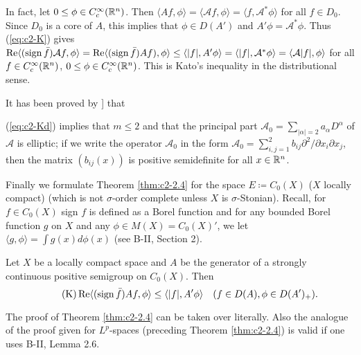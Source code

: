 In fact, let $0 \leq \phi \in C_{c}^{\infty}(\mathbb{R}^n)$.
Then $\langle Af,\phi \rangle = \langle \mathcal{A}f,\phi \rangle = \langle f,\mathcal{A}^{*}\phi \rangle$ for all $f \in D_{0}$.
Since $D_{0}$ is a core of $A$, this implies that $\phi \in D(A')$ and $A'\phi = \mathcal{A}^{*}\phi$.
Thus (\ref{eq:c2-K})   gives $\mathop{}\!\mathrm{Re}\langle(\operatorname{sign} \bar{f})\mathcal{A}f,\phi \rangle = \mathop{}\!\mathrm{Re}\langle(\operatorname{sign} \bar{f})Af),\phi \rangle \leq \langle |f|,A'\phi \rangle = \langle |f|,\mathcal{A}^{*}\phi \rangle = \langle \mathcal{A}|f|,\phi \rangle$ for all $f \in C_{c}^{\infty}(\mathbb{R}^n)$, $0 \leq \phi \in C_{c}^{\infty}(\mathbb{R}^n)$.
This is Kato's inequality in the distributional sense.

\begin{remark*}\label{rem:c2-3.0}
%
%
%
It has been proved by \citet{miyajimaokazawa:1984}] that 

 (\ref{eq:c2-Kd}) implies that $m \leq 2$ and that the principal part $\mathcal{A}_{0} = \sum_{|\alpha|=2} a_{\alpha} D^{\alpha}$ of $\mathcal{A}$ is elliptic; \ie if we write the operator $\mathcal{A}_{0}$ in the form $\mathcal{A}_{0} = \sum_{i,j=1}^{2} b_{ij} \partial^{2}/\partial x_{i} \partial x_{j}$, then the matrix $(b_{ij}(x))$ is positive semidefinite for all $x \in \mathbb{R}^n$.
\end{remark*}

Finally we formulate Theorem \ref{thm:c2-2.4}   for the space $E \coloneq C_{0}(X)$ ($X$ locally compact) (which is not $\sigma$-order complete unless $X$ is $\sigma$-Stonian).
Recall, for $f \in C_{0}(X)$ sign $f$ is defined as a Borel function and for any bounded Borel function $g$ on $X$ and any $\phi \in M(X) = C_{0}(X)'$, we let $\langle g,\phi \rangle = \int g(x) d\phi(x)$ (see B-II, Section 2).
\begin{theorem}\label{thm:c2-2.6}
%
%
%
Let $X$ be a locally compact space and $A$ be the generator of a strongly continuous positive semigroup on 
$C_{0}(X)$.
Then
\begin{equation*}\label{eq:c2-K-3} \tag{K}
\mathop{}\!\mathrm{Re}\langle(\operatorname{sign} \bar{f})Af,\phi \rangle \leq \langle |f|,A'\phi \rangle \quad (f \in D(A), \phi \in D(A')_{+}).
\end{equation*}
\end{theorem}
The proof of Theorem \ref{thm:c2-2.4} can be taken over literally.
Also the analogue of the proof given for $L^p$-spaces (preceding Theorem \ref{thm:c2-2.4})  is valid if one uses B-II, Lemma 2.6.
